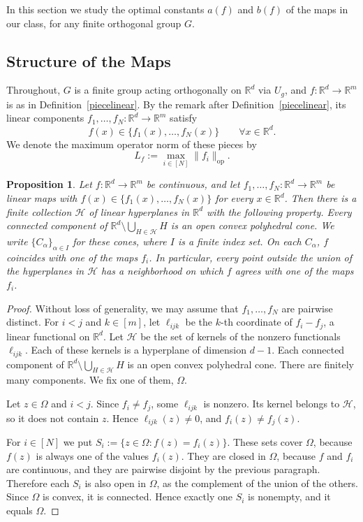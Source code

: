 \documentclass[11pt]{article}
\newcommand{\R}{\mathbb{R}}
\newtheorem{prop}[theor]{Proposition}
\theoremstyle{definition}
\begin{document}
In this section we study the optimal constants $a(f)$ and $b(f)$ of the maps in our
class, for any finite orthogonal group $G$. 
\subsection{Structure of the Maps}
\label{sec:homogeneous-pl}

	Throughout, $G$ is a finite group acting orthogonally on $\R^d$ via $U_g$, and $f:\R^d\to\R^m$ is as in Definition~\ref{piecelinear}. By the remark after Definition~\ref{piecelinear}, its linear components $f_1,\ldots,f_N:\R^d\to\R^m$ satisfy
	\[
	f(x)\in\{f_1(x),\ldots,f_N(x)\} \qquad \forall x\in\R^d.
	\]
	We denote the maximum operator norm of these pieces by
	\[
	L_f:=\max_{i\in[N]}\|f_i\|_{\operatorname{op}}.
	\]


	

	\begin{prop}\label{prop:conic-decomp}
	Let $f:\R^d\to\R^m$ be continuous, and let $f_1,\ldots,f_N:\R^d\to\R^m$ be linear
	maps with $f(x)\in\{f_1(x),\ldots,f_N(x)\}$ for every $x\in\R^d$. Then there is a
	finite collection $\mathcal H$ of linear hyperplanes in $\R^d$ with the following
	property. Every connected component of $\R^d\setminus\bigcup_{H\in\mathcal H}H$ is an
	open convex polyhedral cone. We write $\{C_\alpha\}_{\alpha\in I}$ for these cones,
	where $I$ is a finite index set. On each $C_\alpha$, $f$ coincides with one of the
	maps $f_i$. In particular, every point outside the union of the hyperplanes in
	$\mathcal H$ has a neighborhood on which $f$ agrees with one of the maps $f_i$.
\end{prop}

\begin{proof}Without loss of generality, we may assume that $f_1,\ldots,f_N$ are pairwise distinct. For
$i<j$ and $k\in[m]$, let $\ell_{ijk}$ be the $k$-th coordinate of $f_i-f_j$,
a linear functional on $\R^d$. Let $\mathcal H$ be the set of kernels of the nonzero
functionals $\ell_{ijk}$. Each of these kernels is a hyperplane of dimension $d-1$.
Each connected component of $\R^d\setminus\bigcup_{H\in\mathcal H}H$ is an
open convex polyhedral cone. There are finitely many components. We fix one of them, $\Omega$.

Let $z\in \Omega$ and $i<j$. Since $f_i\neq f_j$, some $\ell_{ijk}$ is nonzero. Its kernel
belongs to $\mathcal H$, so it does not contain $z$. Hence $\ell_{ijk}(z)\neq0$, and
$f_i(z)\neq f_j(z)$.

For $i\in[N]$ we put $S_i:=\{z\in \Omega: f(z)=f_i(z)\}$. These sets cover $\Omega$, because $f(z)$ is always one
of the values $f_i(z)$. They are closed in $\Omega$, because $f$ and $f_i$ are
continuous, and they are pairwise disjoint by the previous paragraph. Therefore each $S_i$ is also open in
$\Omega$, as the complement of the union of the others. Since $\Omega$ is convex, it is
connected. Hence exactly one $S_i$ is nonempty, and it equals $\Omega$.
\end{proof}
\end{document}
